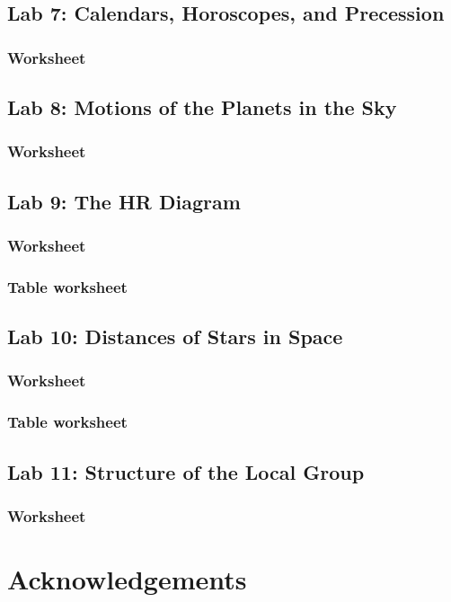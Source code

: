 \documentclass[12pt]{article}
\begin{document}
\subsection{Lab 7: Calendars, Horoscopes, and Precession}
\subsubsection{Worksheet}
%

\subsection{Lab 8: Motions of the Planets in the Sky}
\subsubsection{Worksheet}
%

\subsection{Lab 9: The HR Diagram}
\subsubsection{Worksheet}


\subsubsection{Table worksheet}

\subsection{Lab 10: Distances of Stars in Space}
\subsubsection{Worksheet}


\subsubsection{Table worksheet}

\subsection{Lab 11: Structure of the Local Group}
\subsubsection{Worksheet}
%

\section{Acknowledgements}
\end{document}
